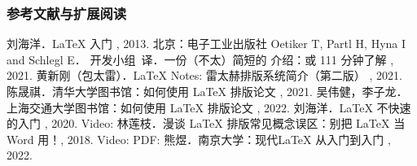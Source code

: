 \begin{frame}[fragile]
    \frametitle{参考文献与扩展阅读}
    \scriptsize
    \begin{multicols}{2}
        \newcommand\TAG[1]{\CASE{[#1]}}
        \begin{thebibliography}{99}
            \scriptsize
            \bibitem{}
            \scriptsize
            刘海洋．\LaTeX{} 入门 \TAG{M}, 2013. 北京：电子工业出版社
            \scriptsize
            \bibitem{}
            \scriptsize
            Oetiker T, Partl H, Hyna I and Schlegl E．\CTeX{} 开发小组~译．一份（不太）简短的 \LaTeXe{} 介绍：或 111 分钟了解 \LaTeXe{} \TAG{EB/OL}, 2021. 
            \scriptsize
            \bibitem{}
            \scriptsize
            黄新刚（包太雷）．\LaTeX{} Notes: 雷太赫排版系统简介（第二版） \TAG{EB/OL}, 2021. \href{https://github.com/huangxg/lnotes}{\faGithub}
            \scriptsize
            \bibitem{}
            \scriptsize
            陈晟祺．清华大学图书馆：如何使用 \LaTeX{} 排版论文 \TAG{EB/OL}, 2021. \href{https://github.com/tuna/thulib-latex-talk}{\faGithub}
            \scriptsize
            \bibitem{}
            \scriptsize
            吴伟健，李子龙．上海交通大学图书馆：如何使用 \LaTeX{} 排版论文 \TAG{EB/OL}, 2022. \href{https://github.com/sjtug/sjtulib-latex-talk}{\faGithub}
            \scriptsize
            \bibitem{}
            \scriptsize
            刘海洋．\LaTeX{} 不快速的入门 \TAG{EB/OL}, 2020. Video: \href{https://www.bilibili.com/video/BV1s7411U7Pr}{\faVideo}
            \scriptsize
            \bibitem{}
            \scriptsize
            林莲枝．漫谈 \LaTeX{} 排版常见概念误区：别把 \LaTeX{} 当 Word 用！\TAG{EB/OL}, 2018. Video: \href{https://www.bilibili.com/video/BV1r4411o7KJ}{\faVideo}\quad
            PDF: \href{http://static.latexstudio.net/wp-content/uploads/2018/03/LianTze-presentation-0320-forReading.pdf}{\faDownload}
            \scriptsize
            \bibitem{}
            \scriptsize
            熊煜．南京大学：现代\LaTeX{} 从入门到入门 \TAG{EB/OL}, 2022. \href{https://git.nju.edu.cn/atXYblip/latex-lecture}{\faGitlab}
        \end{thebibliography}
    \end{multicols}
\end{frame}